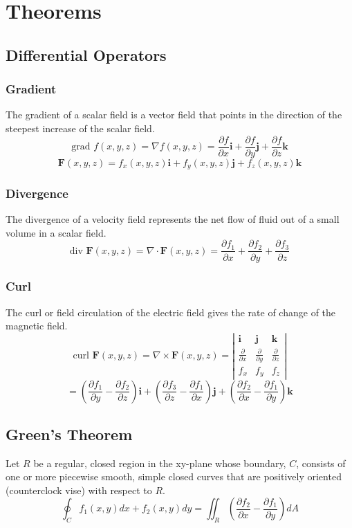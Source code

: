 \section{Theorems}
\subsection{Differential Operators}
\subsubsection{Gradient}
The gradient of a scalar field is a vector field that points in the direction of the steepest increase of the scalar field.
$$\text{grad }f(x,y,z)=\nabla f(x,y,z)=\frac{ \partial f }{ \partial x } \mathbf{i}+\frac{ \partial f }{ \partial y } \mathbf{j}+\frac{ \partial f }{ \partial z } \mathbf{k}$$
$$\mathbf{F}(x,y,z)=f_x(x,y,z)\mathbf{i}+f_y(x,y,z)\mathbf{j}+f_z(x,y,z)\mathbf{k}$$

\subsubsection{Divergence}
The divergence of a velocity field represents the net flow of fluid out of a small volume in a scalar field.
$$\text{div }\mathbf{F}(x,y,z)=\nabla \cdot \mathbf{F}(x,y,z)=\frac{ \partial f_{1} }{ \partial x } +\frac{ \partial f_{2} }{ \partial y } +\frac{ \partial f_{3} }{ \partial z } $$

\subsubsection{Curl}
The curl or field circulation of the electric field gives the rate of change of the magnetic field.
$$\text{curl }\mathbf{F}(x,y,z)
=\nabla \times \mathbf{F}(x,y,z)
=\left|\begin{array}{ccc}\mathbf{i} & \mathbf{j} & \mathbf{k} \\
\frac{ \partial  }{ \partial x } & \frac{ \partial  }{ \partial y } & \frac{ \partial  }{ \partial z } \\
f_{x} & f_{y} & f_{z} \end{array}\right|$$
$$=\left(\frac{ \partial f_{1} }{ \partial y } -\frac{ \partial f_{2} }{ \partial z } \right)\mathbf{i}+\left(\frac{ \partial f_{3} }{ \partial z } -\frac{ \partial f_{1} }{ \partial x } \right)\mathbf{j}+\left(\frac{ \partial f_{2} }{ \partial x } -\frac{ \partial f_{1} }{ \partial y } \right)\mathbf{k}$$

\subsection{Green's Theorem}
Let $R$ be a regular, closed region in the xy-plane whose boundary, $C$, consists of one or more piecewise smooth, simple closed curves that are positively oriented (counterclock vise) with respect to $R$.
$$\oint_{ C } f_1(x, y) d x+f_2(x, y) d y=\iint_{ R }\left(\frac{\partial f_2}{\partial x}-\frac{\partial f_1}{\partial y}\right) d A$$


